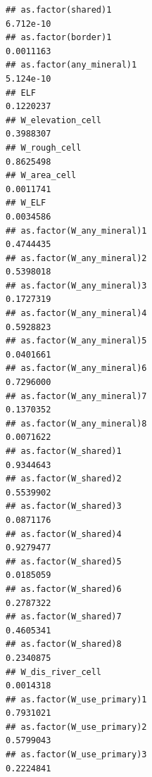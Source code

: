 \documentclass[
  a4paper,
]{article}
\begin{document}
\begin{verbatim}
## as.factor(shared)1                                                                6.712e-10
## as.factor(border)1                                                                0.0011163
## as.factor(any_mineral)1                                                           5.124e-10
## ELF                                                                               0.1220237
## W_elevation_cell                                                                  0.3988307
## W_rough_cell                                                                      0.8625498
## W_area_cell                                                                       0.0011741
## W_ELF                                                                             0.0034586
## as.factor(W_any_mineral)1                                                         0.4744435
## as.factor(W_any_mineral)2                                                         0.5398018
## as.factor(W_any_mineral)3                                                         0.1727319
## as.factor(W_any_mineral)4                                                         0.5928823
## as.factor(W_any_mineral)5                                                         0.0401661
## as.factor(W_any_mineral)6                                                         0.7296000
## as.factor(W_any_mineral)7                                                         0.1370352
## as.factor(W_any_mineral)8                                                         0.0071622
## as.factor(W_shared)1                                                              0.9344643
## as.factor(W_shared)2                                                              0.5539902
## as.factor(W_shared)3                                                              0.0871176
## as.factor(W_shared)4                                                              0.9279477
## as.factor(W_shared)5                                                              0.0185059
## as.factor(W_shared)6                                                              0.2787322
## as.factor(W_shared)7                                                              0.4605341
## as.factor(W_shared)8                                                              0.2340875
## W_dis_river_cell                                                                  0.0014318
## as.factor(W_use_primary)1                                                         0.7931021
## as.factor(W_use_primary)2                                                         0.5799043
## as.factor(W_use_primary)3                                                         0.2224841

\end{verbatim}
\end{document}

